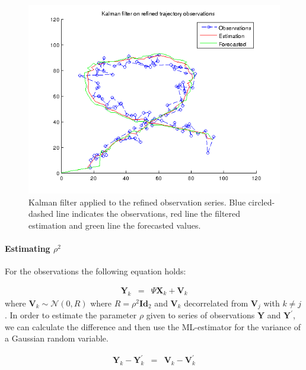 \documentclass[a4paper, 12pt, titlepage]{article}
\begin{document}
\begin{figure}
	\includegraphics[width=15cm]{images/refinedTrajectory.png}
	\caption{Kalman filter applied to the refined observation series. Blue circled-dashed line indicates the observations, red line the filtered estimation and green line the forecasted values.}
	\label{fig:3}
\end{figure}

\paragraph{Estimating $\rho^2$}

For the observations the following equation holds:

\begin{eqnarray}
	\pmb{Y}_k &=& \Psi \pmb{X}_k + \pmb{V}_k \label{eqn:2}
\end{eqnarray}
where $\pmb{V}_k \sim \mathcal{N}(0,R)$ where $R=\rho^2\pmb{Id}_{2}$ and $\pmb{V}_k$ decorrelated from $\pmb{V}_j$ with $k\not=j$.
In order to estimate the parameter $\rho$ given to series of observations $\pmb{Y}$ and $\pmb{Y}^{\prime}$, we can calculate the difference and then use the ML-estimator for the variance of a Gaussian random variable.

\begin{eqnarray}
	\pmb{Y}_k - \pmb{Y}^{\prime}_k &=& \pmb{V}_k - \pmb{V}_{k}^{\prime} \label{eqn:1}
\end{eqnarray}
\end{document}
